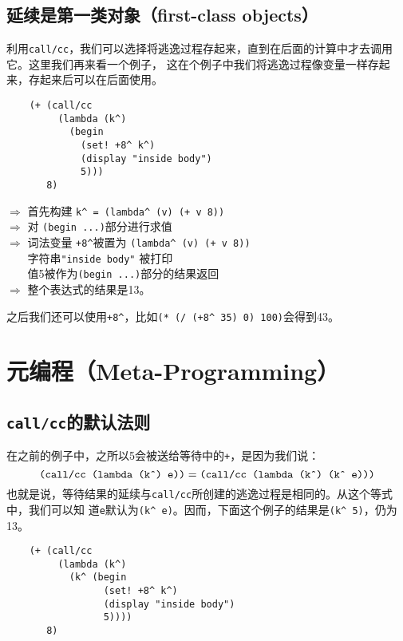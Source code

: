 \documentclass[12pt]{article}
\begin{document}
\subsection{延续是第一类对象（first-class objects）}
\indent{}利用\texttt{call/cc}，我们可以选择将逃逸过程存起来，直到在后面的计算中才去调用它。这里我们再来看一个例子，
这在个例子中我们将逃逸过程像变量一样存起来，存起来后可以在后面使用。
\begin{verbatim}
    (+ (call/cc
         (lambda (k^)
           (begin
             (set! +8^ k^)
             (display "inside body")
             5)))
       8)
\end{verbatim}
$\Longrightarrow$ 首先构建 \texttt{k\^{} = (lambda\^{} (v) (+ v 8))}\\
$\Longrightarrow$ 对 \texttt{(begin ...)}部分进行求值\\
$\Longrightarrow$ 词法变量 \texttt{+8\^{}}被置为 \texttt{(lambda\^{} (v) (+ v 8))}\\
$\textrm{$\;\;$}\quad$ 字符串\texttt{"inside body"} 被打印\\
$\textrm{$\;\;$}\quad$ 值5被作为\texttt{(begin ...)}部分的结果返回\\
$\Longrightarrow$ 整个表达式的结果是13。

\vspace{0.5em}
\noindent{}之后我们还可以使用\texttt{+8\^{}}，比如\texttt{(* (/ (+8\^{} 35) 0) 100)}会得到43。

\section{元编程（Meta-Programming）}
\subsection{\texttt{call/cc}的默认法则}
\indent{}在之前的例子中，之所以5会被送给等待中的\texttt{+}，是因为我们说：
\begin{displaymath}
    \textrm{\texttt{(call/cc (lambda (k\^{}) e))}} = \textrm{\texttt{(call/cc (lambda (k\^{}) (k\^{} e)))}}
\end{displaymath}
也就是说，等待结果的延续与\texttt{call/cc}所创建的逃逸过程是相同的。从这个等式中，我们可以知
道\texttt{e}默认为\texttt{(k\^{} e)}。因而，下面这个例子的结果是\texttt{(k\^{} 5)}，仍为13。
\begin{verbatim}
    (+ (call/cc
         (lambda (k^)
           (k^ (begin
                 (set! +8^ k^)
                 (display "inside body")
                 5))))
       8)
\end{verbatim}
\end{document}
